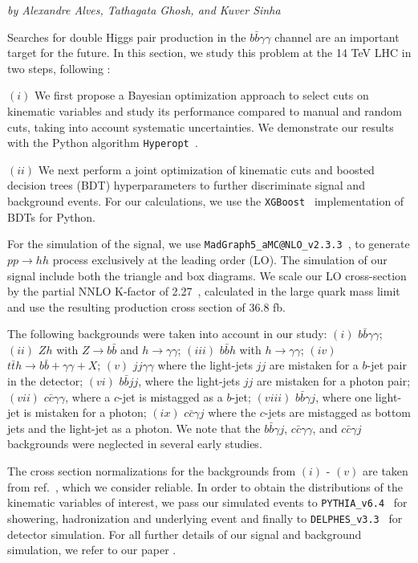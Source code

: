 \textit{by Alexandre Alves, Tathagata Ghosh, and Kuver Sinha}

Searches for double Higgs pair production in the $b\bar{b}\gamma\gamma$ channel are an important target for the future. In this section, we study this problem at the 14 TeV LHC in two steps, following \cite{Alves:2017ued}: 

$(i)$ We first propose a Bayesian optimization approach to select cuts on kinematic variables and study its performance compared to manual and random cuts, taking into account systematic uncertainties. We demonstrate our results with the Python algorithm \texttt{Hyperopt }.

$(ii)$ We next perform a joint optimization of kinematic cuts and boosted decision trees (BDT) hyperparameters to further discriminate signal and background events.  For our calculations, we use the \texttt{XGBoost }  implementation of BDTs for Python. 


For the simulation of the signal, we use {\tt MadGraph5\_aMC@NLO\_v2.3.3}~\cite{MG5}, to generate $p p \rightarrow h h$ process exclusively at the leading order (LO). The simulation of our signal
include both the triangle and box diagrams. We scale our LO cross-section by the partial NNLO K-factor of 2.27~\cite{deFlorian:2013uza}, calculated in the large quark mass limit and use the resulting production cross section of 36.8 fb.

The following backgrounds were taken into account in our study: $(i)$ $b\bar{b}\gamma\gamma$; $(ii)$ $Zh$ with $Z \rightarrow b\bar{b}$ and $h \rightarrow \gamma\gamma$; $(iii)$ $b\bar{b}h$ with $h\to\gamma\gamma$; $(iv)$
$t\bar{t}h \rightarrow b\bar{b}+\gamma\gamma+X$; $(v)$ $jj\gamma\gamma$ where the light-jets $jj$ are mistaken for a $b$-jet pair in the detector; $(vi)$ $b\bar{b}jj$,  where the light-jets $jj$ are mistaken for a photon pair; $(vii)$ $c\bar{c}\gamma\gamma$, where a $c$-jet is mistagged as a $b$-jet; $(viii)$ $b\bar{b}\gamma j$, where one light-jet is mistaken for a photon; $(ix)$ $c\bar{c}\gamma j$ where the $c$-jets are mistagged as bottom jets and the light-jet as a photon. We note that the $b\bar{b}\gamma j$, $c\bar{c}\gamma\gamma$, and $c\bar{c}\gamma j$ backgrounds were neglected in several early studies. 
 
The cross section normalizations for the backgrounds from $(i)$ - $(v)$ are taken from ref.~\cite{Azatov:2015oxa}, which we consider reliable. In order to obtain the distributions of the kinematic variables of interest, we pass our simulated events to {\tt PYTHIA\_v6.4}~\cite{pythia} for showering, hadronization and underlying event and finally to {\tt DELPHES\_v3.3}~\cite{delphes} for detector simulation. For all further details of our signal and background simulation, we refer to our paper \cite{Alves:2017ued}. 


